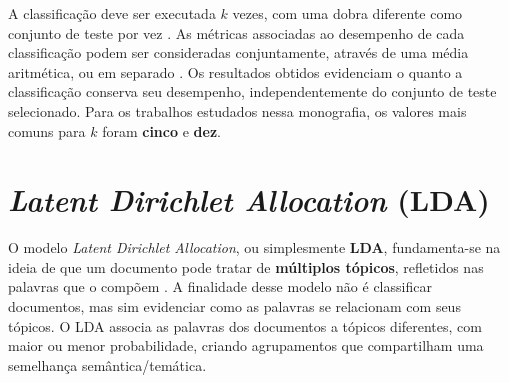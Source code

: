 A classificação deve ser executada \ensuremath{k} vezes, com uma dobra diferente como conjunto de teste por vez \cite{ron-kohavi}. As métricas associadas ao desempenho de cada classificação podem ser consideradas conjuntamente, através de uma média aritmética, ou em separado \cite{payam-leitang}. Os resultados obtidos evidenciam o quanto a classificação conserva seu desempenho, independentemente do conjunto de teste selecionado. Para os trabalhos estudados nessa monografia, os valores mais comuns para \ensuremath{k} foram \textbf{cinco} e \textbf{dez}. 



\section{\emph{Latent Dirichlet Allocation} (LDA)}
\label{subsection:LDA}


O modelo \emph{Latent Dirichlet Allocation}, ou simplesmente \textbf{LDA}, fundamenta-se na ideia de que um documento pode tratar de \textbf{múltiplos tópicos}, refletidos nas palavras que o compõem \cite{pnas}. A finalidade desse modelo não é classificar documentos, mas sim evidenciar como as palavras se relacionam com seus tópicos. O LDA associa as palavras dos documentos a tópicos diferentes, com maior ou menor probabilidade, criando agrupamentos que compartilham uma semelhança semântica/temática. 

